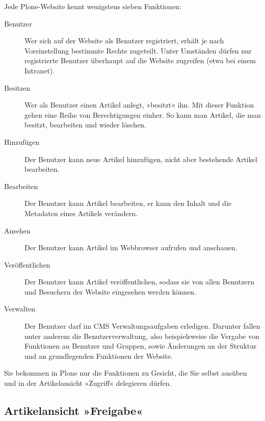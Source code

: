 \documentclass[a4paper,12pt,ngerman]{manual}
\begin{document}
Jede Plone-Website kennt wenigstens sieben Funktionen:
\begin{description}
\item[Benutzer] \leavevmode
Wer sich auf der Website als Benutzer registriert, erhält je
nach Voreinstellung bestimmte Rechte zugeteilt. Unter Umständen dürfen nur
registrierte Benutzer überhaupt auf die Website zugreifen (etwa bei einem
Intranet).

\item[Besitzen] \leavevmode
Wer als Benutzer einen Artikel anlegt, »besitzt« ihn. Mit
dieser Funktion gehen eine Reihe von Berechtigungen einher. So kann man
Artikel, die man besitzt, bearbeiten und wieder löschen.

\item[Hinzufügen] \leavevmode
Der Benutzer kann neue Artikel hinzufügen, nicht aber
bestehende Artikel bearbeiten.

\item[Bearbeiten] \leavevmode
Der Benutzer kann Artikel bearbeiten, er kann den Inhalt und
die Metadaten eines Artikels verändern.

\item[Ansehen] \leavevmode
Der Benutzer kann Artikel im Webbrowser aufrufen und anschauen.

\item[Veröffentlichen] \leavevmode
Der Benutzer kann Artikel veröffentlichen, sodass sie
von allen Benutzern und Besuchern der Website eingesehen werden können.

\item[Verwalten] \leavevmode
Der Benutzer darf im CMS Verwaltungsaufgaben
erledigen. Darunter fallen unter anderem die Benutzerverwaltung, also
beispielsweise die Vergabe von Funktionen an Benutzer und Gruppen, sowie
Änderungen an der Struktur und an grundlegenden Funktionen der Website.

\end{description}

Sie bekommen in Plone nur die Funktionen zu Gesicht, die Sie selbst ausüben
und in der Artikelansicht »Zugriff« delegieren dürfen.
\hypertarget{sec-zugriffsrechte-ansicht}{}

\subsection{Artikelansicht »Freigabe«}
\end{document}
